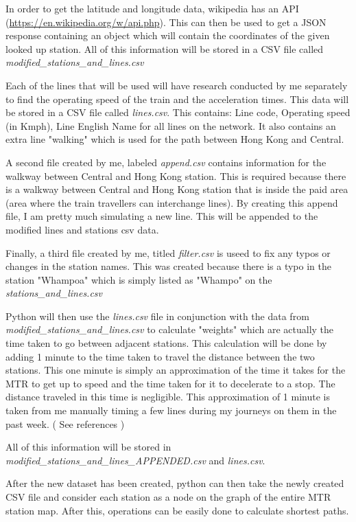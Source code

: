 \documentclass[fontsize=11pt]{article}
\begin{document}
In order to get the latitude and longitude data, wikipedia has an API (\url{https://en.wikipedia.org/w/api.php}). This can then be used to get a JSON response containing an object which will contain the coordinates of the given looked up station. All of this information will be stored in a CSV file called \textit{modified\_stations\_and\_lines.csv}


Each of the lines that will be used will have research conducted by me separately to find the operating speed of the train and the acceleration times. This data will be stored in a CSV file called \textit{lines.csv}. This contains: Line code, Operating speed (in Kmph), Line English Name for all lines on the network. It also contains an extra line "walking" which is used for the path between Hong Kong and Central. 

A second file created by me, labeled \textit{append.csv} contains information for the walkway between Central and Hong Kong station. This is required because there is a walkway between Central and Hong Kong station that is inside the paid area (area where the train travellers can interchange lines). By creating this append file, I am pretty much simulating a new line. This will be appended to the modified lines and stations csv data.

Finally, a third file created by me, titled \textit{filter.csv} is useed to fix any typos or changes in the station names. This was created because there is a typo in the station "Whampoa" which is simply listed as "Whampo" on the \textit{stations\_and\_lines.csv}

Python will then use the \textit{lines.csv} file in conjunction with the data from \textit{modified\_stations\_and\_lines.csv} to calculate "weights" which are actually the time taken to go between adjacent stations. This calculation will be done by adding 1 minute to the time taken to travel the distance between the two stations. This one minute is simply an approximation of the time it takes for the MTR to get up to speed and the time taken for it to decelerate to a stop. The distance traveled in this time is negligible. This approximation of 1 minute is taken from me manually timing a few lines during my journeys on them in the past week. ( See references )

All of this information will be stored in \textit{modified\_stations\_and\_lines\_APPENDED.csv} and \textit{lines.csv}. 

After the new dataset has been created, python can then take the newly created CSV file and consider each station as a node on the graph of the entire MTR station map. After this, operations can be easily done to calculate shortest paths.  
\end{document}

